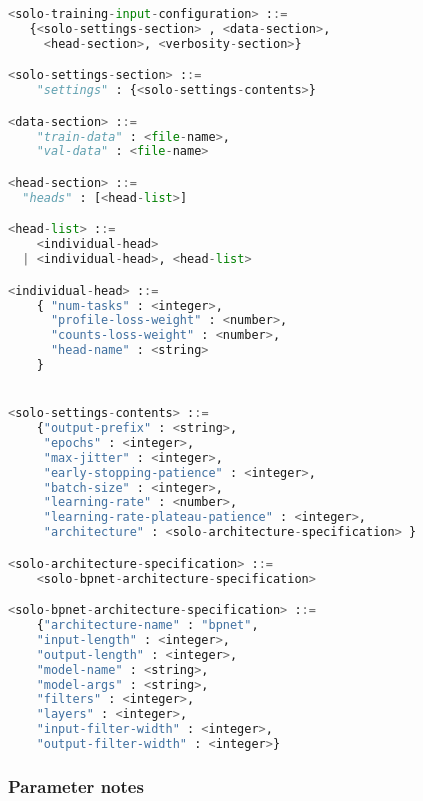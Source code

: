 \documentclass{article}
\begin{document}
\begin{lstlisting}[language=python]
<solo-training-input-configuration> ::=
   {<solo-settings-section> , <data-section>,
     <head-section>, <verbosity-section>}

<solo-settings-section> ::=
    "settings" : {<solo-settings-contents>}

<data-section> ::=
    "train-data" : <file-name>,
    "val-data" : <file-name>

<head-section> ::=
  "heads" : [<head-list>]

<head-list> ::=
    <individual-head>
  | <individual-head>, <head-list>

<individual-head> ::=
    { "num-tasks" : <integer>,
      "profile-loss-weight" : <number>,
      "counts-loss-weight" : <number>,
      "head-name" : <string>
    }


<solo-settings-contents> ::=
    {"output-prefix" : <string>,
     "epochs" : <integer>,
     "max-jitter" : <integer>,
     "early-stopping-patience" : <integer>,
     "batch-size" : <integer>,
     "learning-rate" : <number>,
     "learning-rate-plateau-patience" : <integer>,
     "architecture" : <solo-architecture-specification> }

<solo-architecture-specification> ::=
    <solo-bpnet-architecture-specification>

<solo-bpnet-architecture-specification> ::=
    {"architecture-name" : "bpnet",
    "input-length" : <integer>,
    "output-length" : <integer>,
    "model-name" : <string>,
    "model-args" : <string>,
    "filters" : <integer>,
    "layers" : <integer>,
    "input-filter-width" : <integer>,
    "output-filter-width" : <integer>}

\end{lstlisting}

\subsubsection{Parameter notes}
\end{document}

